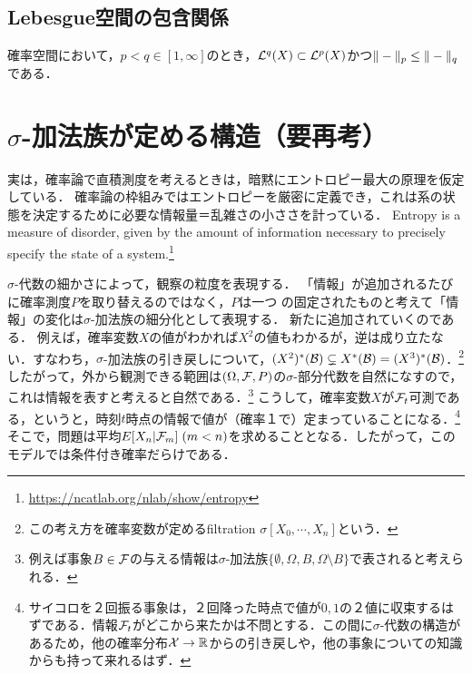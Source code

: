 \documentclass[uplatex,dvipdfmx]{jsreport}
\begin{document}
\subsection{Lebesgue空間の包含関係}

\begin{theorem}
    確率空間において，$p<q\in[1,\infty]$のとき，$\mathcal{L}^q(X)\subset\mathcal{L}^p(X)$かつ$\|-\|_p\le\|-\|_q$である．
\end{theorem}

\section{$\sigma$-加法族が定める構造（要再考）}

\begin{tcolorbox}[colframe=ForestGreen, colback=ForestGreen!10!white,breakable,colbacktitle=ForestGreen!40!white,coltitle=black,fonttitle=\bfseries\sffamily,
title=]
実は，確率論で直積測度を考えるときは，暗黙にエントロピー最大の原理を仮定している．
確率論の枠組みではエントロピーを厳密に定義でき，これは系の状態を決定するために必要な情報量＝乱雑さの小ささを計っている．
Entropy is a measure of disorder, given by the amount of information necessary to precisely specify the state of a system.\footnote{\url{https://ncatlab.org/nlab/show/entropy}}
\end{tcolorbox}

\begin{remark}
    $\sigma$-代数の細かさによって，観察の粒度を表現する．
    「情報」が追加されるたびに確率測度$P$を取り替えるのではなく，$P$は一つ
    の固定されたものと考えて「情報」の変化は$\sigma$-加法族の細分化として表現する．
    新たに追加されていくのである．
    例えば，確率変数$X$の値がわかれば$X^2$の値もわかるが，逆は成り立たない．すなわち，$\sigma$-加法族の引き戻しについて，$(X^2)^*(\mathcal{B})\subsetneq X^*(\mathcal{B})=(X^3)^*(\mathcal{B})$．\footnote{この考え方を確率変数が定めるfiltration $\sigma[X_0,\cdots,X_n]$という．}
    したがって，外から観測できる範囲は$(\Omega,\mathcal{F},P)$の$\sigma$-部分代数を自然になすので，これは情報を表すと考えると自然である．\footnote{例えば事象$B\in\mathcal{F}$の与える情報は$\sigma$-加法族$\{\emptyset,\Omega,B,\Omega\setminus B\}$で表されると考えられる．}
    こうして，確率変数$X$が$\mathcal{F}_t$可測である，というと，時刻$t$時点の情報で値が（確率１で）定まっていることになる．\footnote{サイコロを２回振る事象は，２回降った時点で値が$0,1$の２値に収束するはずである．情報$\mathcal{F}_t$がどこから来たかは不問とする．この間に$\sigma$-代数の構造があるため，他の確率分布$\mathcal{X}\to\mathbb{R}$からの引き戻しや，他の事象についての知識からも持って来れるはず．}
    そこで，問題は平均$E[X_n|\mathcal{F}_m]\;(m<n)$を求めることとなる．したがって，このモデルでは条件付き確率だらけである．
\end{remark}
\end{document}
